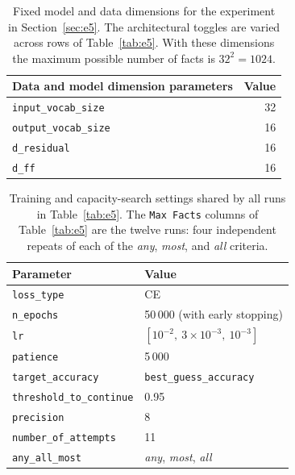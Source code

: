 \documentclass[11pt,a4paper]{article}
\begin{document}
\begin{table}[ht]
\centering
\begin{tabular}{@{}lr@{}}
\toprule
\textbf{Data and model dimension parameters} & \textbf{Value} \\
\midrule
\texttt{input\_vocab\_size}  & 32 \\
\texttt{output\_vocab\_size} & 16 \\
\texttt{d\_residual}         & 16 \\
\texttt{d\_ff}               & 16 \\
\bottomrule
\end{tabular}
\caption{Fixed model and data dimensions for the experiment in Section~\ref{sec:e5}. The architectural toggles are varied across rows of Table~\ref{tab:e5}. With these dimensions the maximum possible number of facts is $32^2 = 1024$.}
\label{tab:e5-fixed}
\end{table}

\begin{table}[ht]
\centering
\begin{tabular}{@{}ll@{}}
\toprule
\textbf{Parameter} & \textbf{Value} \\
\midrule
\texttt{loss\_type}            & CE \\
\texttt{n\_epochs}             & 50\,000 (with early stopping) \\
\texttt{lr}                    & $[10^{-2},\ 3\times10^{-3},\ 10^{-3}]$ \\
\texttt{patience}              & 5\,000 \\
\texttt{target\_accuracy}      & \texttt{best\_guess\_accuracy} \\
\texttt{threshold\_to\_continue} & 0.95 \\
\texttt{precision}             & 8 \\
\texttt{number\_of\_attempts}  & 11 \\
\texttt{any\_all\_most}        & \emph{any}, \emph{most}, \emph{all} \\
\bottomrule
\end{tabular}
\caption{Training and capacity-search settings shared by all runs in Table~\ref{tab:e5}. The \texttt{Max Facts} columns of Table~\ref{tab:e5} are the twelve runs: four independent repeats of each of the \emph{any}, \emph{most}, and \emph{all} criteria.}
\label{tab:e5-runparams}
\end{table}
\end{document}
